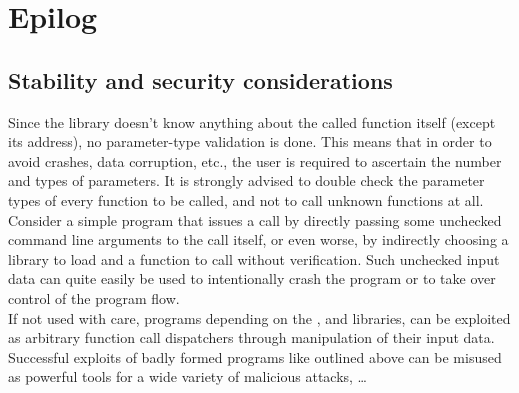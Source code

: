 %
%
%
%

\newpage

\section{Epilog}

\subsection{Stability and security considerations}

Since the  library doesn't know anything about the called
function itself (except its address), no parameter-type validation is done.
This means that in order to avoid crashes, data corruption, etc., the user is
required to ascertain the number and types of parameters. It is strongly advised to
double check the parameter types of every function to be called, and not to
call unknown functions at all.\\

Consider a simple program that issues a call by directly passing some
unchecked command line arguments to the call itself, or even worse, by indirectly
choosing a library to load and a function to call without verification.
Such unchecked input data can quite easily be used to intentionally crash the
program or to take over control of the program flow.\\
If not used with care, programs depending on the ,
 and  libraries, can be exploited as
arbitrary function call dispatchers through manipulation of their input data.
Successful exploits of badly formed programs like outlined above can be misused
as powerful tools for a wide variety of malicious attacks, \ldots
 

